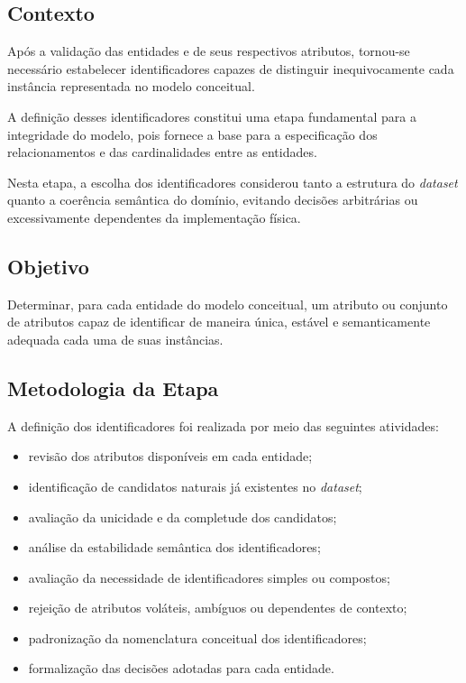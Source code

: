 \documentclass[12pt,a4paper]{article}
\begin{document}
	\subsection{Contexto}
	
	Após a validação das entidades e de seus respectivos atributos, tornou-se
	necessário estabelecer identificadores capazes de distinguir inequivocamente
	cada instância representada no modelo conceitual.
	
	A definição desses identificadores constitui uma etapa fundamental para a
	integridade do modelo, pois fornece a base para a especificação dos
	relacionamentos e das cardinalidades entre as entidades.
	
	Nesta etapa, a escolha dos identificadores considerou tanto a estrutura do
	\textit{dataset} quanto a coerência semântica do domínio, evitando decisões
	arbitrárias ou excessivamente dependentes da implementação física.
	
	\subsection{Objetivo}
	
	Determinar, para cada entidade do modelo conceitual, um atributo ou conjunto de
	atributos capaz de identificar de maneira única, estável e semanticamente
	adequada cada uma de suas instâncias.
	
	\subsection{Metodologia da Etapa}
	
	A definição dos identificadores foi realizada por meio das seguintes
	atividades:
	
	\begin{itemize}[leftmargin=1.2cm]
		\item revisão dos atributos disponíveis em cada entidade;
		\item identificação de candidatos naturais já existentes no \textit{dataset};
		\item avaliação da unicidade e da completude dos candidatos;
		\item análise da estabilidade semântica dos identificadores;
		\item avaliação da necessidade de identificadores simples ou compostos;
		\item rejeição de atributos voláteis, ambíguos ou dependentes de contexto;
		\item padronização da nomenclatura conceitual dos identificadores;
		\item formalização das decisões adotadas para cada entidade.
	\end{itemize}
	
\end{document}
